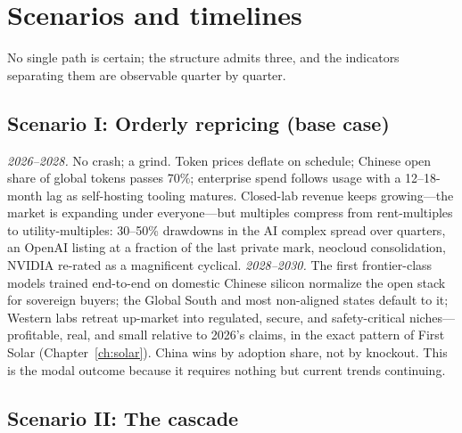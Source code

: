 \section{Scenarios and timelines}
\label{sec:scenarios}

No single path is certain; the structure admits three, and the indicators separating them are observable quarter by quarter.

\subsection{Scenario I: Orderly repricing (base case)}

\emph{2026--2028.} No crash; a grind. Token prices deflate on schedule; Chinese open share of global tokens passes 70\%; enterprise spend follows usage with a 12--18-month lag as self-hosting tooling matures. Closed-lab revenue keeps growing---the market is expanding under everyone---but multiples compress from rent-multiples to utility-multiples: 30--50\% drawdowns in the AI complex spread over quarters, an OpenAI listing at a fraction of the last private mark, neocloud consolidation, NVIDIA re-rated as a magnificent cyclical. \emph{2028--2030.} The first frontier-class models trained end-to-end on domestic Chinese silicon normalize the open stack for sovereign buyers; the Global South and most non-aligned states default to it; Western labs retreat up-market into regulated, secure, and safety-critical niches---profitable, real, and small relative to 2026's claims, in the exact pattern of First Solar (Chapter~\ref{ch:solar}). China wins by adoption share, not by knockout. This is the modal outcome because it requires nothing but current trends continuing.

\subsection{Scenario II: The cascade}

